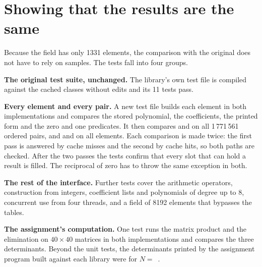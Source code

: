 \section{Showing that the results are the same}
\label{sec:equivalence}

Because the field has only 1331 elements, the comparison with the original does not have to
rely on samples. The tests fall into four groups.

\textbf{The original test suite, unchanged.} The library's own test file is compiled
against the cached classes without edits and its 11 tests pass.

\textbf{Every element and every pair.} A new test file builds each element in both
implementations and compares the stored polynomial, the coefficients, the printed form and
the zero and one predicates. It then compares  and  on all
1\,771\,561 ordered pairs, and  and  on all elements. Each
comparison is made twice: the first pass is answered by cache misses and the second by cache
hits, so both paths are checked. After the two passes the tests confirm that every slot that
can hold a result is filled. The reciprocal of zero has to throw the same exception in both.

\textbf{The rest of the interface.} Further tests cover the arithmetic operators,
construction from integers, coefficient lists and polynomials of degree up to 8, concurrent
use from four threads, and a field of 8192 elements that bypasses the tables.

\textbf{The assignment's computation.} One test runs the matrix product and the elimination
on $40 \times 40$ matrices in both implementations and compares the three determinants.
Beyond the unit tests, the determinants printed by the assignment program built against each
library were \SeqIdenticalVerdict{} for $N = $~\SeqIdenticalSizes.

\LibraryChecksParagraph
